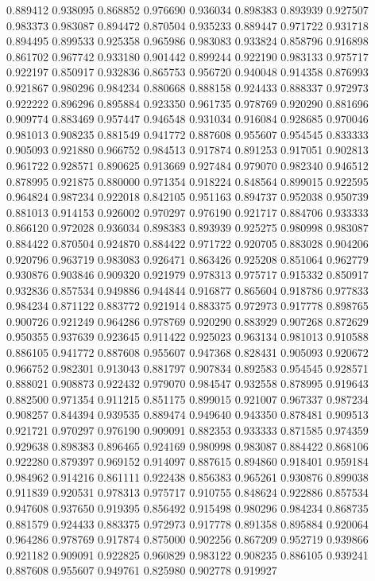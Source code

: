 0.889412
0.938095
0.868852
0.976690
0.936034
0.898383
0.893939
0.927507
0.983373
0.983087
0.894472
0.870504
0.935233
0.889447
0.971722
0.931718
0.894495
0.899533
0.925358
0.965986
0.983083
0.933824
0.858796
0.916898
0.861702
0.967742
0.933180
0.901442
0.899244
0.922190
0.983133
0.975717
0.922197
0.850917
0.932836
0.865753
0.956720
0.940048
0.914358
0.876993
0.921867
0.980296
0.984234
0.880668
0.888158
0.924433
0.888337
0.972973
0.922222
0.896296
0.895884
0.923350
0.961735
0.978769
0.920290
0.881696
0.909774
0.883469
0.957447
0.946548
0.931034
0.916084
0.928685
0.970046
0.981013
0.908235
0.881549
0.941772
0.887608
0.955607
0.954545
0.833333
0.905093
0.921880
0.966752
0.984513
0.917874
0.891253
0.917051
0.902813
0.961722
0.928571
0.890625
0.913669
0.927484
0.979070
0.982340
0.946512
0.878995
0.921875
0.880000
0.971354
0.918224
0.848564
0.899015
0.922595
0.964824
0.987234
0.922018
0.842105
0.951163
0.894737
0.952038
0.950739
0.881013
0.914153
0.926002
0.970297
0.976190
0.921717
0.884706
0.933333
0.866120
0.972028
0.936034
0.898383
0.893939
0.925275
0.980998
0.983087
0.884422
0.870504
0.924870
0.884422
0.971722
0.920705
0.883028
0.904206
0.920796
0.963719
0.983083
0.926471
0.863426
0.925208
0.851064
0.962779
0.930876
0.903846
0.909320
0.921979
0.978313
0.975717
0.915332
0.850917
0.932836
0.857534
0.949886
0.944844
0.916877
0.865604
0.918786
0.977833
0.984234
0.871122
0.883772
0.921914
0.883375
0.972973
0.917778
0.898765
0.900726
0.921249
0.964286
0.978769
0.920290
0.883929
0.907268
0.872629
0.950355
0.937639
0.923645
0.911422
0.925023
0.963134
0.981013
0.910588
0.886105
0.941772
0.887608
0.955607
0.947368
0.828431
0.905093
0.920672
0.966752
0.982301
0.913043
0.881797
0.907834
0.892583
0.954545
0.928571
0.888021
0.908873
0.922432
0.979070
0.984547
0.932558
0.878995
0.919643
0.882500
0.971354
0.911215
0.851175
0.899015
0.921007
0.967337
0.987234
0.908257
0.844394
0.939535
0.889474
0.949640
0.943350
0.878481
0.909513
0.921721
0.970297
0.976190
0.909091
0.882353
0.933333
0.871585
0.974359
0.929638
0.898383
0.896465
0.924169
0.980998
0.983087
0.884422
0.868106
0.922280
0.879397
0.969152
0.914097
0.887615
0.894860
0.918401
0.959184
0.984962
0.914216
0.861111
0.922438
0.856383
0.965261
0.930876
0.899038
0.911839
0.920531
0.978313
0.975717
0.910755
0.848624
0.922886
0.857534
0.947608
0.937650
0.919395
0.856492
0.915498
0.980296
0.984234
0.868735
0.881579
0.924433
0.883375
0.972973
0.917778
0.891358
0.895884
0.920064
0.964286
0.978769
0.917874
0.875000
0.902256
0.867209
0.952719
0.939866
0.921182
0.909091
0.922825
0.960829
0.983122
0.908235
0.886105
0.939241
0.887608
0.955607
0.949761
0.825980
0.902778
0.919927
